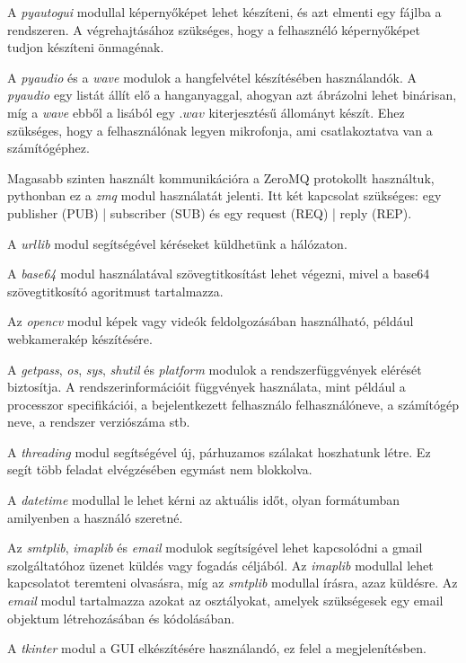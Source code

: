 \documentclass[12pt,a4paper,oneside]{report}
\begin{document}
A \emph{pyautogui} modullal képernyőképet lehet készíteni, és azt elmenti egy fájlba a rendszeren. A végrehajtásához szükséges, hogy a felhasznéló képernyőképet tudjon készíteni önmagénak.

A \emph{pyaudio} és a \emph{wave} modulok a hangfelvétel készítésében használandók. A \emph{pyaudio} egy listát állít elő a hanganyaggal, ahogyan azt ábrázolni lehet binárisan, míg a \emph{wave} ebből a lisából egy $.wav$ kiterjesztésű állományt készít. Ehez szükséges, hogy a felhasználónak legyen mikrofonja, ami csatlakoztatva van a számítógéphez.

Magasabb szinten használt kommunikációra a ZeroMQ protokollt használtuk, pythonban ez a \emph{zmq} modul használatát jelenti. Itt két kapcsolat szükséges: egy publisher (PUB) | subscriber (SUB) és egy request (REQ) | reply (REP).

A \emph{urllib} modul segítségével kéréseket küldhetünk a hálózaton.

A \emph{base64} modul használatával szövegtitkosítást lehet végezni, mivel a base64 szövegtitkosító agoritmust tartalmazza.

Az \emph{opencv} modul képek vagy videók feldolgozásában használható, például webkamerakép készítésére.

A \emph{getpass}, \emph{os}, \emph{sys}, \emph{shutil} és \emph{platform} modulok a rendszerfüggvények elérését biztosítja. A rendszerinformációit függvények használata, mint például a processzor specifikációi, a bejelentkezett felhasználo felhasználóneve, a számítógép neve, a rendszer verziószáma stb.

A \emph{threading} modul segítségével új, párhuzamos szálakat hoszhatunk létre. Ez segít több feladat elvégzésében egymást nem blokkolva.

A \emph{datetime} modullal le lehet kérni az aktuális időt, olyan formátumban amilyenben a használó szeretné. %

Az \emph{smtplib}, \emph{imaplib} és \emph{email} modulok segítsígével lehet kapcsolódni a gmail szolgáltatóhoz üzenet küldés vagy fogadás céljából. Az \emph{imaplib} modullal lehet kapcsolatot teremteni olvasásra, míg az \emph{smtplib} modullal írásra, azaz küldésre. Az \emph{email} modul tartalmazza azokat az osztályokat, amelyek szükségesek egy email objektum létrehozásában és kódolásában.

A \emph{tkinter} modul a GUI elkészítésére használandó, ez felel a megjelenítésben.
\end{document}
